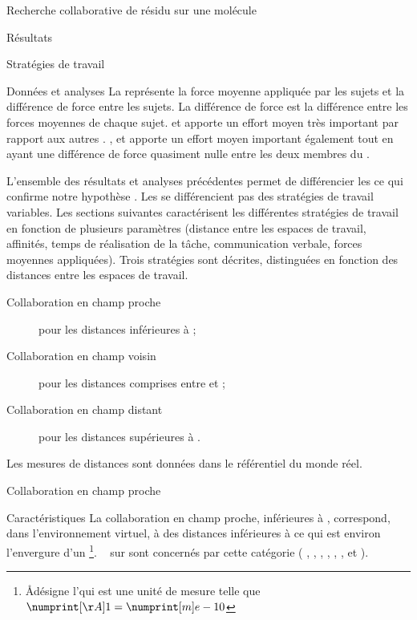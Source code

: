 \documentclass[myfrancais,ngerman,english,french]{mythesis}
\begin{document}
\begin{mychapter}{Recherche collaborative de résidu sur une molécule}
\begin{mysection}{Résultats}
\begin{mysubsection}{Stratégies de travail}
\begin{mysubsubsection}{Données et analyses}
					La  représente la force moyenne appliquée par les sujets  et la différence de force entre les sujets.
					La différence de force est la différence entre les forces moyennes de chaque sujet.
					 et  apporte un effort moyen très important par rapport aux autres .
					,  et  apporte un effort moyen important également tout en ayant une différence de force quasiment nulle entre les deux membres du .

					L'ensemble des résultats et analyses précédentes permet de différencier les  ce qui confirme notre hypothèse .
					Les  se différencient pas des stratégies de travail variables.
					Les sections suivantes caractérisent les différentes stratégies de travail en fonction de plusieurs paramètres (distance entre les espaces de travail, affinités, temps de réalisation de la tâche, communication verbale, forces moyennes appliquées).
					Trois stratégies sont décrites, distinguées en fonction des distances entre les espaces de travail.
					\begin{description}
						\item[Collaboration en champ proche] pour les distances inférieures à ;
						\item[Collaboration en champ voisin] pour les distances comprises entre  et ;
						\item[Collaboration en champ distant] pour les distances supérieures à .
					\end{description}
					Les mesures de distances sont données dans le référentiel du monde réel.
				\end{mysubsubsection}
				\begin{mysubsubsection}{Collaboration en champ proche}
					\begin{myparagraph}{Caractéristiques}
						La collaboration en champ proche, inférieures à , correspond, dans l'environnement virtuel, à des distances inférieures à  ce qui est environ l'envergure d'un \footnote{\og \AA \fg désigne l'\myangstrom qui est une unité de mesure telle que $\mynum[\AA]{1} = \mynum[m]{e-10}$}.
						~ sur  sont concernés par cette catégorie ( , , , , , ,  et ).

\end{myparagraph}
\end{mysubsubsection}
\end{mysubsection}
\end{mysection}
\end{mychapter}
\end{document}
